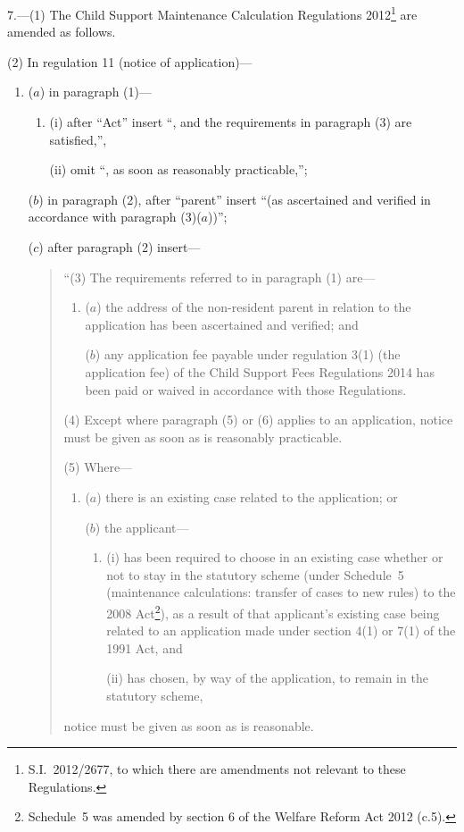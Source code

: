 \documentclass[12pt,a4paper]{article}
\begin{document}
7.—(1) The Child Support Maintenance Calculation Regulations 2012\footnote{S.I.~2012/2677, to which there are amendments not relevant to these Regulations.} are amended as follows.

(2) In regulation 11 (notice of application)—
\begin{enumerate}\item[]
($a$) in paragraph (1)—
\begin{enumerate}\item[]
(i) after “Act” insert “, and the requirements in paragraph (3) are satisfied,”,

(ii) omit “, as soon as reasonably practicable,”;
\end{enumerate}

($b$) in paragraph (2), after “parent” insert “(as ascertained and verified in accordance with paragraph (3)($a$))”;

($c$) after paragraph (2) insert—
\begin{quotation}
“(3) The requirements referred to in paragraph (1) are—
\begin{enumerate}\item[]
($a$) the address of the non-resident parent in relation to the application has been ascertained and verified; and

($b$) any application fee payable under regulation 3(1) (the application fee) of the Child Support Fees Regulations 2014 has been paid or waived in accordance with those Regulations.
\end{enumerate}

(4) Except where paragraph (5) or (6) applies to an application, notice must be given as soon as is reasonably practicable.

(5) Where—
\begin{enumerate}\item[]
($a$) there is an existing case related to the application; or

($b$) the applicant—
\begin{enumerate}\item[]
(i) has been required to choose in an existing case whether or not to stay in the statutory scheme (under Schedule~5 (maintenance calculations: transfer of cases to new rules) to the 2008 Act\footnote{Schedule~5 was amended by section 6 of the Welfare Reform Act 2012 (c.5).}), as a result of that applicant’s existing case being related to an application made under section 4(1) or 7(1) of the 1991 Act, and

(ii) has chosen, by way of the application, to remain in the statutory scheme,
\end{enumerate}
\end{enumerate}
notice must be given as soon as is reasonable.


\end{quotation}
\end{enumerate}
\end{document}
